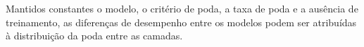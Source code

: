 

Mantidos constantes o modelo, o critério de poda, a taxa de poda e a ausência de
treinamento, as diferenças de desempenho entre os modelos podem ser atribuídas à distribuição
da poda entre as camadas.



